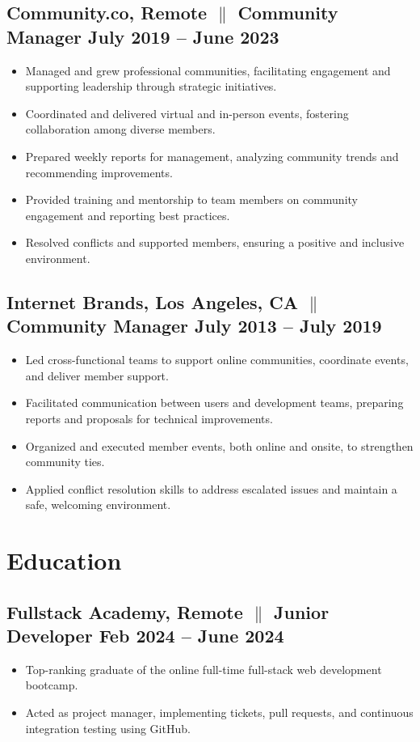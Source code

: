 \documentclass[a4paper,12pt]{article} %
\begin{document}
\subsection{Community.co, Remote {$\parallel$}{ Community Manager} \hfill
      \textbf{July 2019 – June 2023}}
\begin{itemize}
      \item Managed and grew professional communities, facilitating engagement and supporting leadership through strategic initiatives.
      \item Coordinated and delivered virtual and in-person events, fostering collaboration among diverse members.
      \item Prepared weekly reports for management, analyzing community trends and recommending improvements.
      \item Provided training and mentorship to team members on community engagement and reporting best practices.
      \item Resolved conflicts and supported members, ensuring a positive and inclusive environment.
\end{itemize}
\subsection{Internet Brands, Los Angeles, CA {$\parallel$}{ Community Manager} \hfill
      \textbf{July 2013 – July 2019}}
\begin{itemize}
      \item Led cross-functional teams to support online communities, coordinate events, and deliver member support.
      \item Facilitated communication between users and development teams, preparing reports and proposals for technical improvements.
      \item Organized and executed member events, both online and onsite, to strengthen community ties.
      \item Applied conflict resolution skills to address escalated issues and maintain a safe, welcoming environment.
\end{itemize}

\section{Education}
\subsection{Fullstack Academy, Remote {$\parallel$} {Junior Developer} \hfill
      \textbf{Feb 2024 – June 2024}}
\begin{itemize}
      \item Top-ranking graduate of the online full-time full-stack web
            development
            bootcamp.
      \item Acted as project manager, implementing tickets, pull requests, and
            continuous integration testing using GitHub.
\end{itemize}
\end{document}
